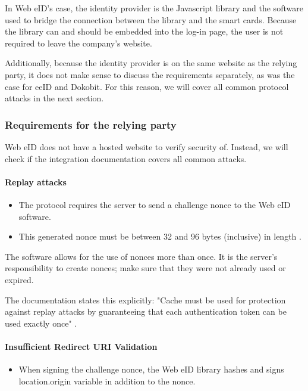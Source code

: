 In Web eID's case, the identity provider is the Javascript library and the software used to bridge the connection between the library and the smart cards. Because the library can and should be embedded into the log-in page, the user is not required to leave the company's website.

Additionally, because the identity provider is on the same website as the relying party, it does not make sense to discuss the requirements separately, as was the case for eeID and Dokobit. For this reason, we will cover all common protocol attacks in the next section.

\subsubsection{Requirements for the relying party}

Web eID does not have a hosted website to verify security of. Instead, we will check if the integration documentation covers all common attacks.

\paragraph{Replay attacks}

\begin{itemize}
  \item The protocol requires the server to send a challenge nonce to the Web eID software.
  \item This generated nonce must be between 32 and 96 bytes (inclusive) in length \cite{ria-webeid-source-web-eid-app-authenticate}.
\end{itemize}

The software allows for the use of nonces more than once. It is the server's responsibility to create nonces; make sure that they were not already used or expired.

The documentation states this explicitly: "Cache must be used for protection against replay attacks by guaranteeing that each authentication token can be used exactly once" \cite{ria-webeid-source-web-eid-authtoken-validation-java-readme}.

\paragraph{Insufficient Redirect URI Validation}

\begin{itemize}
  \item When signing the challenge nonce, the Web eID library hashes and signs {location.origin} variable in addition to the nonce.
\end{itemize}

